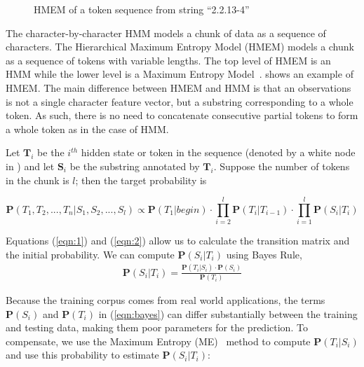 \begin{figure}[th]
\begin{center}
\end{center}
\caption{HMEM of a token sequence from string ``2.2.13-4''}\label{fig:hmem}
\end{figure}
The character-by-character HMM models a chunk of data as a sequence of
characters. The Hierarchical Maximum Entropy Model (HMEM) models a chunk as
a sequence of tokens with variable lengths.
The top level of HMEM is an HMM while the lower level 
is a Maximum Entropy Model~\cite{Berger96:ME,megaweb}.
 shows an example of HMEM.
The main difference between HMEM and HMM is
that an observations is not a single character feature vector, 
but a substring corresponding to a whole token.
As such, there is no need to concatenate consecutive partial tokens
to form a whole token as in the case of HMM.

Let $\mathbf{T}_i$ be the $i^{th}$ hidden state or token in the
sequence (denoted by a white node in ) and
let $\mathbf{S}_i$ be the substring annotated by $\mathbf{T}_i$. 
Suppose the number of tokens in the chunk is $l$; then the
target probability is

\begin{equation}
\mathbf{P}(T_1, T_2, ..., T_n|S_1, S_2, ..., S_l)  \propto
\mathbf{P}(T_1|begin) \cdot \prod_{i=2}^{l}{\mathbf{P}(T_i|T_{i-1})}
\cdot \prod_{i=1}^{l}\mathbf{P}(S_i|T_i)
\end{equation}

Equations (\ref{eqn:1}) and (\ref{eqn:2}) allow us to calculate
the transition matrix and the initial probability.
We can compute $\mathbf{P}(S_i|T_i)$ using Bayes Rule,
\begin{eqnarray} \label{eqn:bayes}
\mathbf{P}(S_i|T_i) = \frac{\mathbf{P}(T_i|S_i) \cdot
\mathbf{P}(S_i)}{\mathbf{P}(T_i)}
\end{eqnarray}

Because the training corpus comes from real world applications, 
the terms $\mathbf{P}(S_i)$ and $\mathbf{P}(T_i)$ in (\ref{eqn:bayes})
can differ substantially between the training and
testing data, making them poor parameters for 
the prediction. To compensate, we use the Maximum Entropy (ME)~\cite{??} method
to compute 
$\mathbf{P}(T_i|S_i)$ and use this probability to estimate
$\mathbf{P}(S_i|T_i)$:

